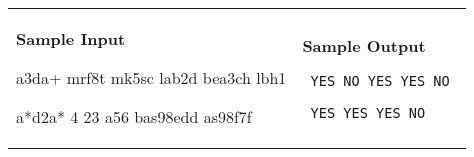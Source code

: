 \documentclass[11pt]{article}
\begin{document}
\vspace{0.25in}\hspace{-0.3in}\begin{tabular}{ll}

\parbox{3in}{{\large\bf Sample Input}

\vspace{0.15in}

{\tt 

a3da+  \linebreak
mrf8t \linebreak
mk5sc \linebreak
lab2d \linebreak
bea3ch \linebreak
lbh1

}

{\tt

a*d2a*
4
23
a56
bas98edd
as98f7f

}
}

&

\parbox{3in}{{\large\bf Sample Output}

\vspace{0.15in}

{\tt
YES \linebreak
NO \linebreak
YES \linebreak
YES \linebreak
NO
}

{\tt
YES \linebreak
YES \linebreak
YES \linebreak
NO
}
}

\\
\end{tabular}
\end{document}
